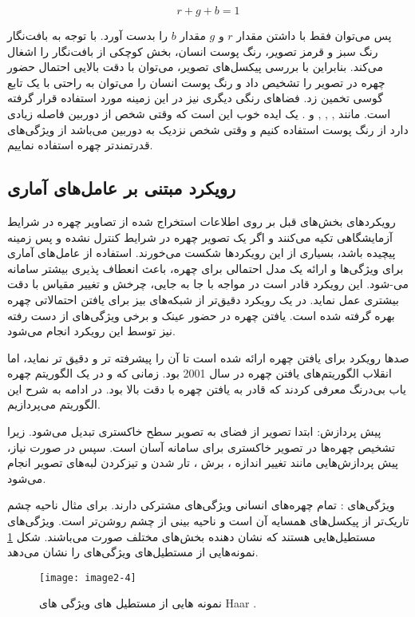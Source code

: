 \begin{equation}\label{eq2-4}
r + g + b = 1
\end{equation}
 	
\noindent
پس می‌توان فقط با داشتن مقدار $r$ و $g$ مقدار $b$ را بدست آورد. با توجه به بافت‌نگار  رنگ سبز و قرمز تصویر، رنگ پوست انسان، بخش کوچکی از بافت‌نگار را اشغال می‌کند. بنابراین با بررسی پیکسل‌های تصویر، می‌توان با دقت بالایی احتمال حضور چهره در تصویر را تشخیص داد و رنگ پوست انسان را می‌توان به راحتی با یک تابع گوسی تخمین زد. فضاهای رنگی دیگری نیز در این زمینه مورد استفاده قرار گرفته است. مانند , , , و . یک ایده خوب این است که وقتی شخص از دوربین فاصله زیادی دارد از رنگ پوست استفاده کنیم و وقتی شخص نزدیک به دوربین می‌باشد از ویژگی‌های قدرتمندتر چهره استفاده نماییم.

\subsection{رویکرد مبتنی بر عامل‌های آماری}
رویکرد‌های بخش‌های قبل بر روی اطلاعات استخراج شده از تصاویر چهره در شرایط آزمایشگاهی تکیه می‌کنند و اگر یک تصویر چهره در شرایط کنترل نشده و پس زمینه پیچیده باشد، بسیاری از این رویکردها شکست می‌خورند. استفاده از عامل‌های آماری  برای ویژگی‌ها و ارائه یک مدل احتمالی برای چهره، باعث انعطاف پذیری بیشتر سامانه می-شود. این رویکرد قادر است در مواجه با جا به جایی، چرخش و تغییر مقیاس با دقت بیشتری عمل نماید. در یک رویکرد دقیق‌تر از شبکه‌های بیز  برای یافتن احتمالاتی چهره بهره گرفته شده است. یافتن چهره در حضور عینک و برخی ویژگی‌های از دست رفته نیز توسط این رویکرد انجام می‌شود.

\noindent
صدها رویکرد برای یافتن چهره ارائه شده است تا آن را پیشرفته تر و دقیق تر نماید، اما انقلاب الگوریتم‌های یافتن چهره در سال 2001 بود. زمانی که  و  در \cite{990517} یک الگوریتم چهره یاب بی‌درنگ معرفی کردند که قادر به یافتن چهره با دقت بالا بود. در ادامه به شرح این الگوریتم می‌پردازیم.

\noindent
پیش پردازش: ابتدا تصویر از فضای  به تصویر سطح خاکستری تبدیل می‌شود. زیرا تشخیص چهره‌ها در تصویر خاکستری برای سامانه آسان است. سپس در صورت نیاز، پیش پردازش‌هایی مانند تغییر اندازه ، برش ، تار شدن  و تیزکردن لبه‌های تصویر  انجام می‌شود. 

\noindent
ویژگی‌های : تمام چهره‌های انسانی ویژگی‌های مشترکی دارند. برای مثال ناحیه چشم تاریک‌تر از پیکسل‌های همسایه آن است و ناحیه بینی از چشم روشن‌تر است. ویژگی‌های  مستطیل‌هایی هستند که نشان دهنده بخش‌های مختلف صورت می‌باشند. شکل \ref{image2-4} نمونه‌هایی از مستطیل‌های ویژگی‌های  را نشان می‌دهد.
\begin{figure}[h]
\centering
  \texttt{[image: image2-4]}
  \caption{نمونه هایی از مستطیل های ویژگی های Haar \cite{990517}.}
  \label{image2-4}
\end{figure}

